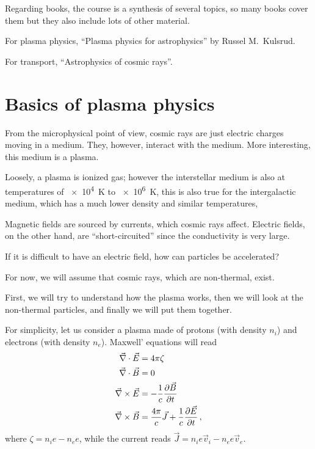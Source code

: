 \documentclass[main.tex]{subfiles}
\begin{document}

Regarding books, the course is a synthesis of several topics, so many books cover them but they also include lots of other material.

For plasma physics, ``Plasma physics for astrophysics'' by Russel M.\ Kulsrud.

For transport, ``Astrophysics of cosmic rays''.

\section{Basics of plasma physics}

From the microphysical point of view, cosmic rays are just electric charges moving in a medium. 
They, however, interact with the medium. 
More interesting, this medium is a plasma. 

Loosely, a plasma is ionized gas; however the interstellar medium is also at temperatures of \SI{e4}{K} to \SI{e6}{K}, this is also true for the intergalactic medium, which has a much lower density and similar temperatures, 


Magnetic fields are sourced by currents, which cosmic rays affect. 
Electric fields, on the other hand, are ``short-circuited'' since the conductivity is very large. 

If it is difficult to have an electric field, how can particles be accelerated? 

For now, we will assume that cosmic rays, which are non-thermal, exist. 

First, we will try to understand how the plasma works, then we will look at the non-thermal particles, and finally we will put them together. 

For simplicity, let us consider a plasma made of protons (with density \(n_i\)) and electrons (with density \(n_e\)). 
Maxwell' equations will read 
%
\begin{subequations}\label{eq:maxwell}
\begin{align}
\vec{\nabla} \cdot \vec{E} &= 4 \pi \zeta  \\
\vec{\nabla} \cdot \vec{B} &= 0  \\
\vec{\nabla} \times \vec{E} &= - \frac{1}{c} \pdv{\vec{B}}{t}  \\
\vec{\nabla} \times \vec{B} &= \frac{4 \pi }{c} \vec{J} + \frac{1}{c} \pdv{\vec{E}}{t}
\,,
\end{align}
\end{subequations}
%
where \(\zeta = n_i e - n_e e\), while the current reads \(\vec{J} = n_i e \vec{v}_i - n_e e \vec{v}_e\). 
\end{document}
